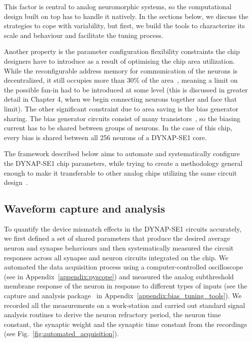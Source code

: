 This factor is central to analog neuromorphic systems, so the computational design built on top has to handle it natively. In the sections below, we discuss the strategies to cope with variability, but first, we build the tools to characterize its scale and behaviour and facilitate the tuning process.

Another property is the parameter configuration flexibility constraints the chip designers have to introduce as a result of optimising the chip area utilization. While the reconfigurable address memory for communication of the neurons is decentralized, it still occupies more than 30\% of the area~\cite{Moradi_etal18}, meaning a limit on the possible fan-in had to be introduced at some level (this is discussed in greater detail in Chapter 4, when we begin connecting neurons together and face that limit). The other significant constraint due to area saving is the bias generator sharing. The bias generator circuits consist of many transistors~\cite{Delbruck_etal10}, so the biasing current has to be shared between groups of neurons. In the case of this chip, every bias is shared between all 256 neurons of a \ac{DYNAP}-SE1 core.

The framework described below aims to automate and systematically configure the \ac{DYNAP}-SE1 chip parameters, while trying to create a methodology general enough to make it transferable to other analog chips utilizing the same circuit design~\cite{Qiao_etal15, Richter_etal24}.


\subsection{Waveform capture and analysis}

To quantify the device mismatch effects in the DYNAP-SE1 circuits accurately, we first defined a set of shared parameters that produce the desired average neuron and synapse behaviours and then systematically measured the circuit responses across all synapse and neuron circuits integrated on the chip.
We automated the data acquisition process using a computer-controlled oscilloscope (see  in Appendix~\ref{appendix:pyscope}) and measured the analog subthreshold membrane response of the neuron in response to different types of inputs (see the capture and analysis package~ in Appendix~\ref{appendix:bias_tuning_tools}).
We recorded all the measurements on a work-station and carried out standard signal analysis routines to derive the neuron refractory period, the neuron time constant, the synaptic weight and the synaptic time constant from the recordings (see Fig.~\ref{fig:automated_acquisition}).


